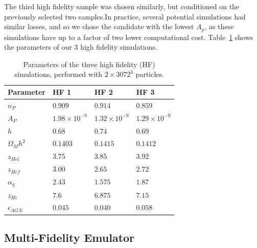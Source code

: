 \documentclass[a4paper,11pt]{article}
\begin{document}
The third high fidelity sample was chosen similarly, but conditioned on the previously selected two samples.In practice, several potential simulations had similar losses, and so we chose the candidate with the lowest $A_p$, as these simulations have up to a factor of two lower computational cost.
Table~\ref{tab:highfidelity} shows the parameters of our $3$ high fidelity simulations.


\begin{table}
\begin{centering}
  \begin{tabular}{llll}
  \hline
  Parameter & HF 1 & HF 2 & HF 3\\
    \hline
    $n_P$  &  $0.909$  & $0.914$ & $0.859$ \\
    $A_P$  &  $1.98 \times 10^{-9}$  & $1.32 \times 10^{-9}$ & $1.29 \times 10^{-9}$\\
    $h$    & $0.68$  & $0.74$ & $0.69$\\
    $\Omega_M h^2$ & $0.1403$ & $0.1415$ & $0.1412$\\
    $z_{Hei}$      & $3.75$  & $3.85$  & $ 3.92$ \\
    $z_{Hef}$      & $3.00$  & $2.65$  & $2.72$\\
    $\alpha_q$     & $2.43$  & $1.575$ & $ 1.87$ \\
    $z_{Hi}$        & $7.6$ & $6.875$   & $7.15 $\\
    $\epsilon_{AGN}$ & $0.045$ & $0.040$ & $ 0.058$\\
    \hline
  \end{tabular}
  \caption{Parameters of the three high fidelity (HF) simulations, performed with $2\times 3072^3$ particles.}
  \label{tab:highfidelity}
  \end{centering}
\end{table}

\subsection{Multi-Fidelity Emulator}
\label{sec:gpemulator}
\end{document}
